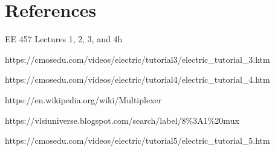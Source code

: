 \documentclass{article}
\begin{document}
\newpage
\section{References}

\noindent [\text{1}] EE 457 Lectures 1, 2, 3, and 4h

\noindent [\text{2}] https://cmosedu.com/videos/electric/tutorial3/electric\_tutorial\_3.htm 

\noindent [\text{3}] https://cmosedu.com/videos/electric/tutorial4/electric\_tutorial\_4.htm 

\noindent [\text{4}] https://en.wikipedia.org/wiki/Multiplexer

\noindent [\text{5}] https://vlsiuniverse.blogspot.com/search/label/8\%3A1\%20mux

\noindent [\text{6}] https://cmosedu.com/videos/electric/tutorial5/electric\_tutorial\_5.htm 
\end{document}
